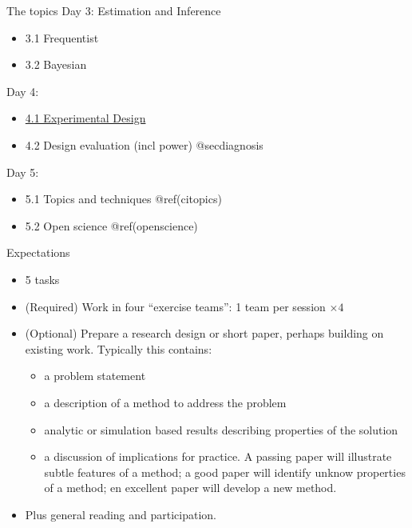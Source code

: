 \documentclass[
  11pt,
  ignorenonframetext,
]{beamer}
\providecommand{\tightlist}{%
  \setlength{\itemsep}{0pt}\setlength{\parskip}{0pt}}\usepackage{longtable,booktabs,array}
\begin{document}
\begin{frame}{The topics}
\protect\hypertarget{the-topics-1}{}
Day 3: Estimation and Inference

\begin{itemize}
\tightlist
\item
  3.1 Frequentist
\item
  3.2 Bayesian
\end{itemize}

Day 4:

\begin{itemize}
\tightlist
\item
  \href{@secdesign}{4.1 Experimental Design}
\item
  4.2 Design evaluation (incl power) @secdiagnosis
\end{itemize}

Day 5:

\begin{itemize}
\tightlist
\item
  5.1 Topics and techniques @ref(citopics)
\item
  5.2 Open science @ref(openscience)
\end{itemize}
\end{frame}

\begin{frame}{Expectations}
\protect\hypertarget{expectations}{}
\begin{itemize}
\tightlist
\item
  5 tasks
\item
  (Required) Work in four ``exercise teams'': 1 team per session
  \(\times 4\)
\item
  (Optional) Prepare a research design or short paper, perhaps building
  on existing work. Typically this contains:

  \begin{itemize}
  \tightlist
  \item
    a problem statement
  \item
    a description of a method to address the problem
  \item
    analytic or simulation based results describing properties of the
    solution
  \item
    a discussion of implications for practice. A passing paper will
    illustrate subtle features of a method; a good paper will identify
    unknow properties of a method; en excellent paper will develop a new
    method.
  \end{itemize}
\item
  Plus general reading and participation.
\end{itemize}
\end{frame}
\end{document}
